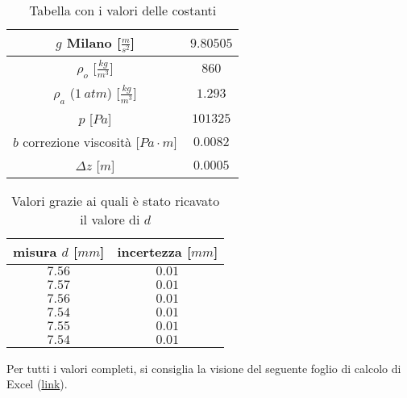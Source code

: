 \documentclass{article}
\begin{document}
\begin{table}[H]
	\center
	\begin{tabular}{| c | c |}
		\hline
		$g$ Milano [$\frac m{s^2}$] & $9.80505$\\
		\hline
		$\rho_o$ [$\frac{kg}{m^3}$] & $860$\\
		\hline
		$\rho_a$ ($1\ atm$) [$\frac{kg}{m^3}$] & $1.293$\\
		\hline
		$p$ [$Pa$] & $101325$\\
		\hline
		$b$ correzione viscosità [$Pa\cdot m$] & $0.0082$\\
		\hline
		$\Delta z$ [$m$] & $0.0005$\\
		\hline
	\end{tabular}
	\caption{Tabella con i valori delle costanti}
\end{table}

\begin{table}[H]
	\center
	\begin{tabular}{| c | c |}
		\hline
		misura $d$ [$mm$] & incertezza [$mm$]\\
		\hline
		$7.56$ & $0.01$ \\
		$7.57$ & $0.01$ \\
		$7.56$ & $0.01$ \\
		$7.54$ & $0.01$ \\
		$7.55$ & $0.01$ \\
		$7.54$ & $0.01$ \\
		\hline
	\end{tabular}
	\caption{Valori grazie ai quali è stato ricavato il valore di $d$}
\end{table}

Per tutti i valori completi, si consiglia la visione del seguente foglio di calcolo di Excel (\href{https://github.com/definetly-not-carl/millikan/blob/master/Esperienza_Millikan_Moroni-Musa-Pasolini.xlsx}{link}).
\end{document}
